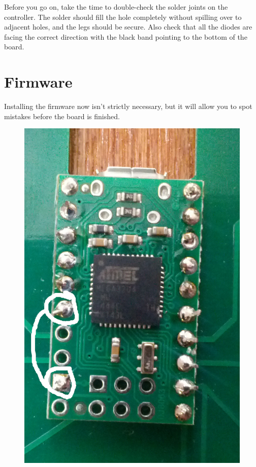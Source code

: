 \documentclass{article}
\begin{document}
\vspace{1em}
\noindent{}
\vspace{1em}

Before you go on, take the time to double-check the solder joints on
the controller. The solder should fill the hole completely without
spilling over to adjacent holes, and the legs should be secure. Also
check that all the diodes are facing the correct direction with the
black band pointing to the bottom of the board.

\section{Firmware}

Installing the firmware now isn't strictly necessary, but it will
allow you to spot mistakes before the board is finished.

\vspace{1em}

\begin{figure}
  \includegraphics[width=0.8\linewidth]{reset.jpg}
\end{figure}
\end{document}
